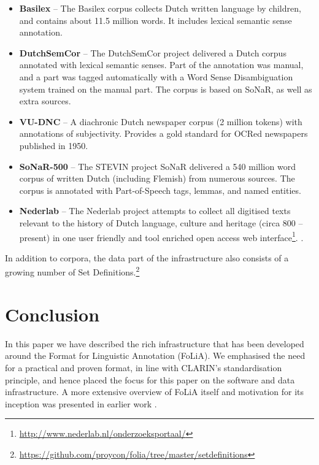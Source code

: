 \documentclass[a4paper,11pt]{article}
\begin{document}
\begin{itemize}
    \item \textbf{Basilex} -- The Basilex corpus collects Dutch written language by children,
        and contains about 11.5 million words. It includes lexical semantic sense
        annotation. \cite{BASILEX}
    \item \textbf{DutchSemCor} -- The DutchSemCor project delivered a Dutch corpus annotated
        with lexical semantic senses. Part of the annotation was manual, and a
        part was tagged automatically with a Word Sense Disambiguation system trained on
        the manual part. The corpus is based on SoNaR, as well as extra
        sources. \cite{DUTCHSEMCOR}
    \item \textbf{VU-DNC} -- A diachronic Dutch newspaper corpus (2 million tokens) with annotations of subjectivity. Provides a gold standard for OCRed newspapers published in 1950. \cite{VUDNC}
    \item \textbf{SoNaR-500} --  The STEVIN project SoNaR delivered a 540 million
        word corpus of written Dutch (including Flemish) from numerous sources.
        The corpus is annotated with Part-of-Speech tags, lemmas, and named
        entities. \cite{StevinSONAR2013}
    \item \textbf{Nederlab} -- The Nederlab project attempts to collect all digitised texts relevant to the history of Dutch language, culture and heritage (circa 800 -- present) in one user friendly and tool enriched open access web interface\footnote{\url{http://www.nederlab.nl/onderzoeksportaal/}}. \cite{Nederlab2016}. 
\end{itemize}

In addition to corpora, the data part of the infrastructure also consists of a
growing number of Set
Definitions.\footnote{\url{https://github.com/proycon/folia/tree/master/setdefinitions}}

\section{Conclusion}
\label{sec:conclusion}

In this paper we have described the rich infrastructure that has been developed around
the Format for Linguistic Annotation (FoLiA). We emphasised the need for a
practical and proven format, in line with CLARIN's standardisation principle,
and hence placed the focus for this paper on the software and data
infrastructure. A more extensive overview of FoLiA itself and motivation for its
inception was presented in earlier work \cite{FOLIACLIN2013}.
\end{document}

